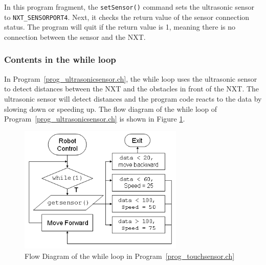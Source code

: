 \documentclass[11pt]{article}
\begin{document}
In this program fragment, the \verb+setSensor()+ command sets the ultrasonic sensor to \verb+NXT_SENSORPORT4+.
Next, it checks the return value of the sensor connection status. The program will quit if the return value 
is 1, meaning there is no connection between the sensor and the NXT.

\subsubsection*{Contents in the while loop}
In Program~\ref{prog_ultrasonicsensor.ch}, the while loop uses the ultrasonic sensor to detect distances 
between the NXT and the obstacles in front of the NXT. The ultrasonic sensor will detect distances and the 
program code reacts to the data by slowing down or speeding up. The flow diagram of the while loop of 
Program~\ref{prog_ultrasonicsensor.ch} is shown in Figure \ref{fig_NXT_ultraflow}.

\begin{figure}[h]
  \begin{center}
    \includegraphics[height=2.4in]{figure/mindstorm/NXT_ultraflow.png}
    \caption{Flow Diagram of the while loop in Program~\ref{prog_touchsensor.ch} \label{fig_NXT_ultraflow}}
  \end{center}
\end{figure}
\end{document}
